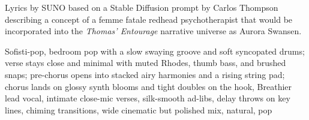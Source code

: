 
\begin{notes}
Lyrics by SUNO based on a Stable Diffusion prompt by Carlos Thompson describing a concept of a femme fatale redhead psychotherapist %
that would be incorporated into the \emph{Thomas’ Entourage} narrative universe as Aurora Swansen.
\end{notes}
\begin{style}
Sofisti-pop, bedroom pop with a slow swaying groove and soft syncopated drums; verse stays close and minimal with muted Rhodes, thumb bass, and brushed snaps; pre-chorus opens into stacked airy harmonies and a rising string pad; chorus lands on glossy synth blooms and tight doubles on the hook, Breathier lead vocal, intimate close-mic verses, silk-smooth ad-libs, delay throws on key lines, chiming transitions, wide cinematic but polished mix, natural, pop
\end{style}
